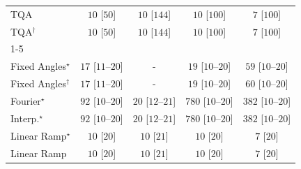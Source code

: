 \begin{tabular}{l|cccc|}
TQA & {\cellcolor[HTML]{F6FCF4}} \color[HTML]{000000} $10$ [$50$] & {\cellcolor[HTML]{F6FCF4}} \color[HTML]{000000} $10$ [$144$] & {\cellcolor[HTML]{F6FCF4}} \color[HTML]{000000} $10$ [$100$] & {\cellcolor[HTML]{F6FCF4}} \color[HTML]{000000} $7$ [$100$] \\
TQA$^\dagger$ & {\cellcolor[HTML]{F6FCF4}} \color[HTML]{000000} $10$ [$50$] & {\cellcolor[HTML]{F6FCF4}} \color[HTML]{000000} $10$ [$144$] & {\cellcolor[HTML]{F6FCF4}} \color[HTML]{000000} $10$ [$100$] & {\cellcolor[HTML]{F6FCF4}} \color[HTML]{000000} $7$ [$100$] \\
\cline{1-5}
\multicolumn{5}{c}{\rule{0pt}{8pt}SV} \\
\midrule
Fixed Angles$^\star$ & {\cellcolor[HTML]{F4FBF2}} \color[HTML]{000000} $17$ [$11$--$20$] & {\cellcolor[HTML]{000000}} \color[HTML]{F1F1F1} {\cellcolor{white}} \color{black} - & {\cellcolor[HTML]{F4FBF2}} \color[HTML]{000000} $19$ [$10$--$20$] & {\cellcolor[HTML]{ECF8E8}} \color[HTML]{000000} $59$ [$10$--$20$] \\
Fixed Angles$^\dagger$ & {\cellcolor[HTML]{F4FBF2}} \color[HTML]{000000} $17$ [$11$--$20$] & {\cellcolor[HTML]{000000}} \color[HTML]{F1F1F1} {\cellcolor{white}} \color{black} - & {\cellcolor[HTML]{F4FBF2}} \color[HTML]{000000} $19$ [$10$--$20$] & {\cellcolor[HTML]{ECF8E8}} \color[HTML]{000000} $60$ [$10$--$20$] \\
Fourier$^\star$ & {\cellcolor[HTML]{E7F6E2}} \color[HTML]{000000} $92$ [$10$--$20$] & {\cellcolor[HTML]{F4FBF1}} \color[HTML]{000000} $20$ [$12$--$21$] & {\cellcolor[HTML]{00441B}} \color[HTML]{F1F1F1} $780$ [$10$--$20$] & {\cellcolor[HTML]{78C679}} \color[HTML]{000000} $382$ [$10$--$20$] \\
Interp.$^\star$ & {\cellcolor[HTML]{E7F6E2}} \color[HTML]{000000} $92$ [$10$--$20$] & {\cellcolor[HTML]{F4FBF1}} \color[HTML]{000000} $20$ [$12$--$21$] & {\cellcolor[HTML]{00441B}} \color[HTML]{F1F1F1} $780$ [$10$--$20$] & {\cellcolor[HTML]{78C679}} \color[HTML]{000000} $382$ [$10$--$20$] \\
Linear Ramp$^\star$ & {\cellcolor[HTML]{F6FCF4}} \color[HTML]{000000} $10$ [$20$] & {\cellcolor[HTML]{F6FCF4}} \color[HTML]{000000} $10$ [$21$] & {\cellcolor[HTML]{F6FCF4}} \color[HTML]{000000} $10$ [$20$] & {\cellcolor[HTML]{F6FCF4}} \color[HTML]{000000} $7$ [$20$] \\
Linear Ramp & {\cellcolor[HTML]{F6FCF4}} \color[HTML]{000000} $10$ [$20$] & {\cellcolor[HTML]{F6FCF4}} \color[HTML]{000000} $10$ [$21$] & {\cellcolor[HTML]{F6FCF4}} \color[HTML]{000000} $10$ [$20$] & {\cellcolor[HTML]{F6FCF4}} \color[HTML]{000000} $7$ [$20$] \\

\end{tabular}
